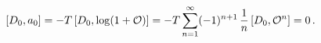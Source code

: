 \begin{equation}
  \label{eq:comma0}
[D_0,a_0] = -T \, [D_0,\log(1+{\cal O})] 
= -T \sum\limits_{n=1}^\infty (-1)^{n+1} \, {1 \over n} \, [D_0,{\cal O}^n] = 0  \,.
\end{equation}

